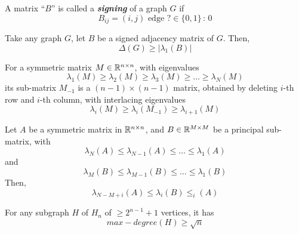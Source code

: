 \begin{definition}
	A matrix ``$B$'' is called a \textit{\textbf{signing}} of a graph $G$ if 
	\begin{equation}
		B_{ij} = (i, j) \text{ edge } ? \in \{0 , 1\} \, : \, 0
	\end{equation}
\end{definition}

\begin{proposition} 
	[Observation 2]
	Take any graph $G$, let $B$ be a signed adjacency matrix of $G$. Then, 
	\begin{equation}
		\Delta (G) \geq |\lambda_1 (B) |
	\end{equation}	
\end{proposition}

\begin{theorem}
	For a symmetric matrix $M \in \mathbb{R}^{n \times n}$, with eigenvalues
	\begin{equation}
		\lambda_1(M) \geq \lambda_2(M) \geq \lambda_3(M) \geq \dots \geq \lambda_N(M)
	\end{equation}
	its sub-matrix $M_{-1}$ is a $(n - 1) \times (n - 1)$ matrix, obtained by deleting $i$-th row and $i$-th column, with interlacing eigenvalues
	\begin{equation}
		\lambda_i(M) \geq \lambda_i (M_{-1}) \geq \lambda_{i + 1} (M)
	\end{equation}
\end{theorem}

\begin{corollary}
	Let $A$ be a symmetric matrix in $\mathbb{R}^{n \times n}$, and $B \in \mathbb{R}^{M \times M}$ be a principal sub-matrix, with
	\begin{equation}
		\lambda_N(A) \leq \lambda_{N - 1} (A) \leq \dots \leq \lambda_1(A)
	\end{equation}
	and 
	\begin{equation}
		\lambda_M(B) \leq \lambda_{M - 1} (B) \leq \dots \leq \lambda_1(B)
	\end{equation}
	Then, 
	\begin{equation}
		\lambda_{N - M + i}(A) \leq \lambda_i(B) \leq_i(A)
	\end{equation}
\end{corollary}

\begin{theorem}
	For any subgraph $H$ of $H_n$ of $\geq 2^{n - 1} + 1$ vertices, it has 
	\begin{equation}
		max-degree(H) \geq \sqrt{ n }
	\end{equation}	
\end{theorem}

